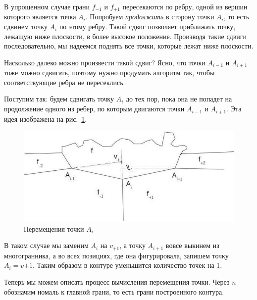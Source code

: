 \documentclass[a4paper,12pt, titlepage]{article}
\begin{document}
\begin{flushleft}
  В упрощенном случае грани $f_{-1}$ и $f_{+1}$ пересекаются по ребру, одной из вершин которого является
точка $A_{i}$. Попробуем \textit{продолжить} в сторону точки $A_{i}$, то есть сдвинем точку $A_{i}$ 
по этому ребру. Такой сдвиг позволяет приближать точку, лежащую ниже плоскости, в более высокое 
положение. Производя такие сдвиги последовательно, мы надеемся поднять все точки, которые лежат ниже 
плоскости.
\end{flushleft}
\begin{flushleft}
  Насколько далеко можно произвести такой сдвиг? Ясно, что точки $A_{i - 1}$ и $A_{i + 1}$ тоже можно
сдвигать, поэтому нужно продумать алгоритм так, чтобы соответствующие ребра не пересеклись.
\end{flushleft}
\begin{flushleft}
  Поступим так: будем сдвигать точку $A_{i}$ до тех пор, пока она не попадет на продолжение одного из 
ребер, по которым двигаются точки $A_{i - 1}$ и $A_{i + 1}$. Эта идея изображена на рис.~\ref{pic-step-3}.
\end{flushleft}
\begin{flushleft}
  \begin{figure}[ht]
    \includegraphics[clip, width=13cm]{img/pic-step-3-1.jpg}
    \caption{Перемещения точки $A_{i}$}\label{pic-step-3}
  \end{figure}
\end{flushleft}
\begin{flushleft}
  В таком случае мы заменим $A_{i}$ на $v_{+1}$, а точку $A_{i + 1}$ вовсе выкинем из многогранника, а во
всех позициях, где она фигурировала, запишем точку $A_{i} = v{+1}$. Таким образом в контуре уменьшится
количество точек на 1.
\end{flushleft}
\begin{flushleft}
 Теперь мы можем описать процесс вычисления перемещения точки. Через $n$ обозначим номаль к главной грани,
то есть грани построенного контура.
\end{flushleft}
\end{document}
